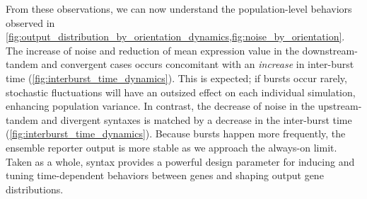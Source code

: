 \documentclass[11pt]{article}
\begin{document}
From these observations, we can now understand the population-level behaviors observed in \cref{fig:output_distribution_by_orientation_dynamics,fig:noise_by_orientation}. 
The increase of noise and reduction of mean expression value in the downstream-tandem and convergent cases occurs concomitant with an \emph{increase} in inter-burst time (\cref{fig:interburst_time_dynamics}). This is expected; if bursts occur rarely, stochastic fluctuations will have an outsized effect on each individual simulation, enhancing population variance. In contrast, the decrease of noise in the upstream-tandem and divergent syntaxes is matched by a decrease in the inter-burst time (\cref{fig:interburst_time_dynamics}). Because bursts happen more frequently, the ensemble reporter output is more stable as we approach the always-on limit.
Taken as a whole, syntax provides a powerful design parameter for inducing and tuning time-dependent behaviors between genes and shaping output gene distributions.

\FloatBarrier
\end{document}
